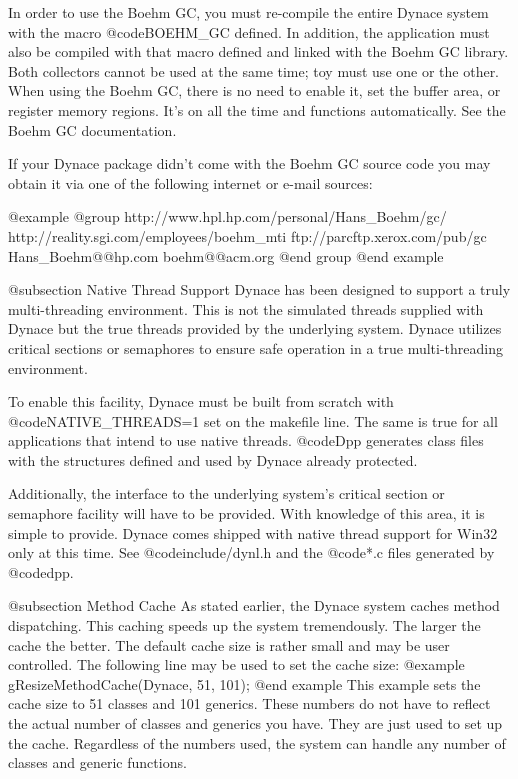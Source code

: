 In order to use the Boehm GC, you must re-compile the entire Dynace
system with the macro @code{BOEHM_GC} defined.  In addition, the
application must also be compiled with that macro defined and linked
with the Boehm GC library.  Both collectors cannot be used at the same
time; toy must use one or the other.  When using the Boehm GC, there is no need to
enable it, set the buffer area, or register memory regions.  It's on all
the time and functions automatically.  See the Boehm GC documentation.

If your Dynace package didn't come with the Boehm GC source code you
may obtain it via one of the following internet or e-mail sources:

@example
@group
http://www.hpl.hp.com/personal/Hans_Boehm/gc/
http://reality.sgi.com/employees/boehm_mti
ftp://parcftp.xerox.com/pub/gc
Hans_Boehm@@hp.com
boehm@@acm.org
@end group
@end example



@subsection Native Thread Support
Dynace has been designed to support a truly multi-threading
environment.  This is not the simulated threads supplied with Dynace
but the true threads provided by the underlying system.  Dynace
utilizes critical sections or semaphores to ensure safe operation
in a true multi-threading environment.

To enable this facility, Dynace must be built from scratch with
@code{NATIVE_THREADS=1} set on the makefile line.  The same is
true for all applications that intend to use native threads.
@code{Dpp} generates class files with the structures defined
and used by Dynace already protected.

Additionally, the interface to the underlying system's critical
section or semaphore facility will have to be provided.  With
knowledge of this area, it is simple to provide.  Dynace comes
shipped with native thread support for Win32 only at this time.
See @code{include/dynl.h} and the @code{*.c} files generated by
@code{dpp}.



@subsection Method Cache
As stated earlier, the Dynace system caches method dispatching.  This
caching speeds up the system tremendously.  The larger the cache the
better.  The default cache size is rather small and may be user
controlled.  The following line may be used to set the cache size:
@example
        gResizeMethodCache(Dynace, 51, 101);
@end example
This example sets the cache size to 51 classes and 101 generics.  These
numbers do not have to reflect the actual number of classes and generics
you have.  They are just used to set up the cache.  Regardless of the
numbers used, the system can handle any number of classes and generic
functions.

